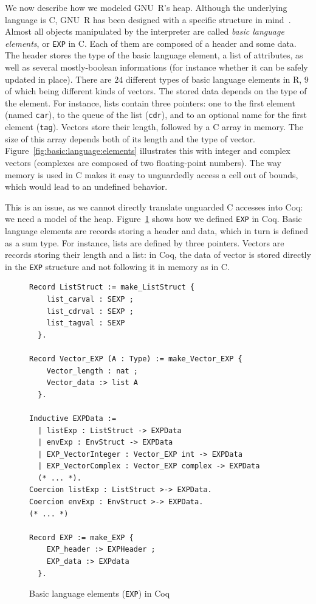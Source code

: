 \documentclass[
    sigplan,
    10pt,
    review, %
    natbib=false %
 ]{acmart}
\begin{document}
We now describe how we modeled GNU~R's heap.
Although the underlying language is C,
GNU~R has been designed with a specific structure in mind~\parencite{R}.
Almost all objects manipulated by the interpreter
are called \emph{basic language elements},
or \texttt{EXP} in C.
Each of them are composed of a header and some data.
%
The header stores the type of the basic language element,
a list of attributes,
as well as several mostly-boolean informations
(for instance whether it can be safely updated in place).
There are \(24\) different types of basic language elements in R,
\(9\) of which being different kinds of vectors.
%
The stored data depends on the type of the element.
For instance, lists contain three pointers:
one to the first element (named \texttt{car}),
to the queue of the list (\texttt{cdr}),
and to an optional name for the first element (\texttt{tag}).
Vectors store their length,
followed by a C array in memory.
The size of this array depends both of its length
and the type of vector.
Figure~\ref{fig:basic:language:elements} illustrates this
with integer and complex vectors
(complexes are composed of two floating-point numbers).
%
The way memory is used in C
makes it easy to unguardedly access a cell out of bounds,
which would lead to an undefined behavior.



This is an issue,
as we cannot directly translate unguarded C accesses into Coq:
we need a model of the heap.
Figure~\ref{fig:EXP} shows how we defined \texttt{EXP} in Coq.
Basic language elements are records storing a header
and data,
which in turn is defined as a sum type.
For instance, lists are defined by three pointers.
Vectors are records storing their length and a list:
in Coq, the data of vector is stored directly in the \texttt{EXP} structure
and not following it in memory as in C.

\begin{figure}
\begin{verbatim}
Record ListStruct := make_ListStruct {
    list_carval : SEXP ;
    list_cdrval : SEXP ;
    list_tagval : SEXP
  }.

Record Vector_EXP (A : Type) := make_Vector_EXP {
    Vector_length : nat ;
    Vector_data :> list A
  }.

Inductive EXPData :=
  | listExp : ListStruct -> EXPData
  | envExp : EnvStruct -> EXPData
  | EXP_VectorInteger : Vector_EXP int -> EXPData
  | EXP_VectorComplex : Vector_EXP complex -> EXPData
  (* ... *).
Coercion listExp : ListStruct >-> EXPData.
Coercion envExp : EnvStruct >-> EXPData.
(* ... *)

Record EXP := make_EXP {
    EXP_header :> EXPHeader ;
    EXP_data :> EXPdata
  }.
\end{verbatim}
\vspace{-1em}
    \caption{Basic language elements (\texttt{EXP}) in Coq}
    \label{fig:EXP}
\end{figure}
\end{document}

